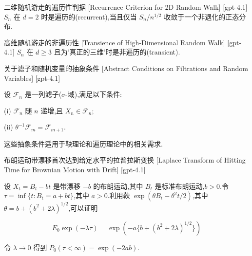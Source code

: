 \documentclass[UTF8]{ctexart}
\begin{document}
    
    
    \begin{thm}
        {二维随机游走的遍历性判据}
        [Recurrence Criterion for 2D Random Walk]
        [gpt-4.1]
        $S_{n}$ 在 $d = 2$ 时是遍历的(recurrent),当且仅当 $S_{n} / n^{1/2}$ 收敛于一个非退化的正态分布.
    \end{thm}
    
    
    
    \begin{thm}
        {高维随机游走的非遍历性}
        [Transience of High-Dimensional Random Walk]
        [gpt-4.1]
        $S_{n}$ 在 $d \ge 3$ 且为'真正的三维'时是非遍历的(transient).
    \end{thm}
    
    
    
    \begin{dfn}
        {关于滤子和随机变量的抽象条件}
        [Abstract Conditions on Filtrations and Random Variables]
        [gpt-4.1]
        
设 $\mathcal{F}_n$ 是一列滤子($\sigma$-域),满足以下条件:

(i) $\mathcal{F}_{n}$ 随 $n$ 递增,且 $X_n \in \mathcal{F}_n$;

(ii) $\theta^{-1} \mathcal{F}_m = \mathcal{F}_{m+1}$.

这些抽象条件适用于鞅理论和遍历理论中的相关需求.

    \end{dfn}
    
    
    
    \begin{xmp}
        {布朗运动带漂移首次达到给定水平的拉普拉斯变换}
        [Laplace Transform of Hitting Time for Brownian Motion with Drift]
        [gpt-4.1]
        
设 $X_t = B_t - b t$ 是带漂移 $-b$ 的布朗运动,其中 $B_t$ 是标准布朗运动,$b > 0$.令 $\tau = \inf\{ t : B_t = a + b t \}$,其中 $a > 0$.利用鞅 $\exp ( \theta B_{t} - \theta^{2} t / 2 )$,其中 $\theta = b + (b^2 + 2\lambda)^{1/2}$,可以证明

\[
E_{0} \exp ( -\lambda \tau ) = \exp ( -a \{ b + ( b^{2} + 2\lambda )^{1/2} \} )
\]

令 $\lambda \to 0$ 得到 $P_{0} ( \tau < \infty ) = \exp ( -2 a b )$.

    \end{xmp}
    
\end{document}
